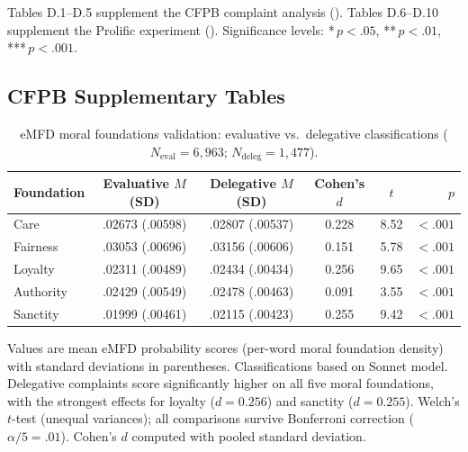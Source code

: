 \noindent Tables D.1--D.5 supplement the CFPB complaint analysis (). Tables D.6--D.10 supplement the Prolific experiment (). Significance levels: {*}\,$p < .05$, {**}\,$p < .01$, {***}\,$p < .001$.

\subsection{CFPB Supplementary Tables}


\begin{table}[H]
\centering
\begin{threeparttable}
\caption{eMFD moral foundations validation: evaluative vs.\ delegative classifications ($N_\text{eval} = 6{,}963$; $N_\text{deleg} = 1{,}477$).}
\label{tab:supp_emfd_class}
\begin{small}
\begin{tabular}{lccccr}
\toprule
Foundation & Evaluative $M$ (SD) & Delegative $M$ (SD) & Cohen's $d$ & $t$ & $p$ \\
\midrule
Care      & .02673 (.00598) & .02807 (.00537) & 0.228 &  8.52 & $< .001$\rlap{***} \\
Fairness  & .03053 (.00696) & .03156 (.00606) & 0.151 &  5.78 & $< .001$\rlap{***} \\
Loyalty   & .02311 (.00489) & .02434 (.00434) & 0.256 &  9.65 & $< .001$\rlap{***} \\
Authority & .02429 (.00549) & .02478 (.00463) & 0.091 &  3.55 & $< .001$\rlap{***} \\
Sanctity  & .01999 (.00461) & .02115 (.00423) & 0.255 &  9.42 & $< .001$\rlap{***} \\
\bottomrule
\end{tabular}
\end{small}
\begin{tablenotes}
\small
\item Values are mean eMFD probability scores (per-word moral foundation density) with standard deviations in parentheses. Classifications based on Sonnet model. Delegative complaints score significantly higher on all five moral foundations, with the strongest effects for loyalty ($d = 0.256$) and sanctity ($d = 0.255$). Welch's $t$-test (unequal variances); all comparisons survive Bonferroni correction ($\alpha / 5 = .01$). Cohen's $d$ computed with pooled standard deviation.
\end{tablenotes}
\end{threeparttable}
\end{table}

